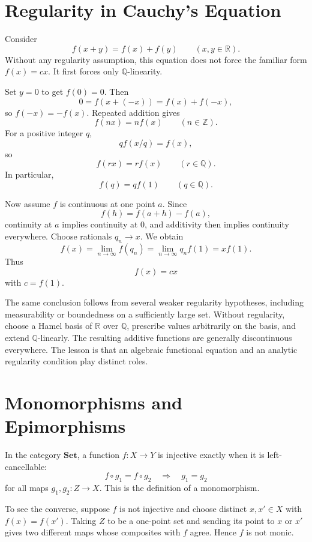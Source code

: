 \section{Regularity in Cauchy's Equation}

Consider
\[
  f(x+y)=f(x)+f(y)
  \qquad(x,y\in\mathbb R).
\]
Without any regularity assumption, this equation does not force the familiar form \(f(x)=cx\).  It first forces only \(\mathbb Q\)-linearity.

Set \(y=0\) to get \(f(0)=0\).  Then
\[
  0=f(x+(-x))=f(x)+f(-x),
\]
so \(f(-x)=-f(x)\).  Repeated addition gives
\[
  f(nx)=nf(x)
  \qquad(n\in\mathbb Z).
\]
For a positive integer \(q\),
\[
  q f(x/q)=f(x),
\]
so
\[
  f(rx)=rf(x)
  \qquad(r\in\mathbb Q).
\]
In particular,
\[
  f(q)=qf(1)
  \qquad(q\in\mathbb Q).
\]

Now assume \(f\) is continuous at one point \(a\).  Since
\[
  f(h)=f(a+h)-f(a),
\]
continuity at \(a\) implies continuity at \(0\), and additivity then implies continuity everywhere.  Choose rationals \(q_n\to x\).  We obtain
\[
  f(x)=\lim_{n\to\infty}f(q_n)
      =\lim_{n\to\infty}q_n f(1)
      =xf(1).
\]
Thus
\[
  \boxed{f(x)=cx}
\]
with \(c=f(1)\).

The same conclusion follows from several weaker regularity hypotheses, including measurability or boundedness on a sufficiently large set.  Without regularity, choose a Hamel basis of \(\mathbb R\) over \(\mathbb Q\), prescribe values arbitrarily on the basis, and extend \(\mathbb Q\)-linearly.  The resulting additive functions are generally discontinuous everywhere.  The lesson is that an algebraic functional equation and an analytic regularity condition play distinct roles.

\section{Monomorphisms and Epimorphisms}

In the category \(\mathbf{Set}\), a function \(f:X\to Y\) is injective exactly when it is left-cancellable:
\[
  f\circ g_1=f\circ g_2
  \quad\Longrightarrow\quad
  g_1=g_2
\]
for all maps \(g_1,g_2:Z\to X\).  This is the definition of a monomorphism.

To see the converse, suppose \(f\) is not injective and choose distinct \(x,x'\in X\) with \(f(x)=f(x')\).  Taking \(Z\) to be a one-point set and sending its point to \(x\) or \(x'\) gives two different maps whose composites with \(f\) agree.  Hence \(f\) is not monic.

